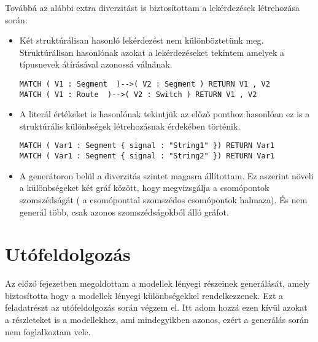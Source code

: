 Továbbá az alábbi extra diverzitást is biztosítottam a lekérdezések létrehozása során:
\begin{itemize}
	\item Két struktúrálisan hasonló lekérdezést nem különböztetünk meg. Struktúrálisan hasonlónak azokat a lekérdezéseket tekintem amelyek a típusnevek átírásával azonossá válnának.
\begin{lstlisting}[style=cyphersmall]
MATCH ( V1 : Segment  )-->( V2 : Segment ) RETURN V1 , V2
MATCH ( V1 : Route  )-->( V2 : Switch ) RETURN V1 , V2
\end{lstlisting}
	\item A literál értékeket is hasonlónak tekintjük az előző ponthoz hasonlóan ez is a struktúrális különbségek létrehozásnak érdekében történik. 
\begin{lstlisting}[style=cyphersmall]
MATCH ( Var1 : Segment { signal : "String1" }) RETURN Var1
MATCH ( Var1 : Segment { signal : "String2" }) RETURN Var1
\end{lstlisting}
	\item A generátoron belül a diverzitás szintet magasra állítottam. Ez aszerint növeli a különbségeket két gráf között, hogy megvizsgálja a csomópontok szomszédságát ( a csomóponttal szomszédos csomópontok halmaza). És nem generál több, csak azonos szomszédságokból álló gráfot.  
\end{itemize}


\section{Utófeldolgozás}
Az előző fejezetben megoldottam a modellek lényegi részeinek generálását, amely biztosította hogy a modellek lényegi különbségekkel rendelkezzenek. Ezt a feladatrészt az utófeldolgozás során végzem el. Itt adom hozzá ezen kívül azokat a részleteket is a modellekhez, ami mindegyikben azonos, ezért a generálás során nem foglalkoztam vele. 


